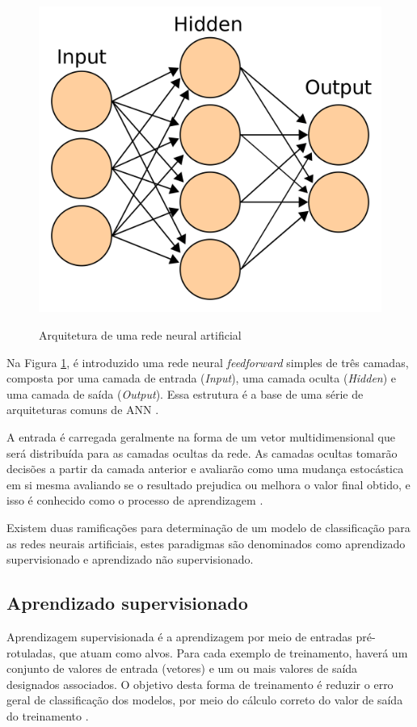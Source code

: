 \documentclass[
	12pt,				%
	oneside,			%
	a4paper,			%
	english,			%
	brazil				%
	]{abntex2ppgsi}
\begin{document}
\begin{figure}[H]
    \centering
    \caption{Arquitetura de uma rede neural artificial}
    \includegraphics[scale=.10]{imagens/artificial_neural_networks_arch.png}
    \label{fig:artificial_neural_networks_arch}
\end{figure}

Na Figura \ref{fig:artificial_neural_networks_arch}, é introduzido uma rede neural \textit{feedforward} simples de três camadas, composta por uma camada de entrada (\textit{Input}), uma camada oculta (\textit{Hidden}) e uma camada de saída (\textit{Output}). Essa estrutura é a base de uma série de arquiteturas comuns de ANN \cite{o2015introduction}.

A entrada é carregada geralmente na forma de um vetor multidimensional que será distribuída para as camadas ocultas da rede. As camadas ocultas tomarão decisões a partir da camada anterior e avaliarão como uma mudança estocástica em si mesma avaliando se o resultado prejudica ou melhora o valor final obtido, e isso é conhecido como o processo de aprendizagem \cite{o2015introduction}. 

Existem duas ramificações para determinação de um modelo de classificação para as redes neurais artificiais, estes paradigmas são denominados como aprendizado supervisionado e aprendizado não supervisionado.

\subsection{Aprendizado supervisionado}
Aprendizagem supervisionada é a aprendizagem por meio de entradas pré-rotuladas, que atuam como alvos. Para cada exemplo de treinamento, haverá um conjunto de valores de entrada (vetores) e um ou mais valores de saída designados associados. O objetivo desta forma de treinamento é reduzir o erro geral de classificação dos modelos, por meio do cálculo correto do valor de saída do treinamento \cite{o2015introduction}.
\end{document}

